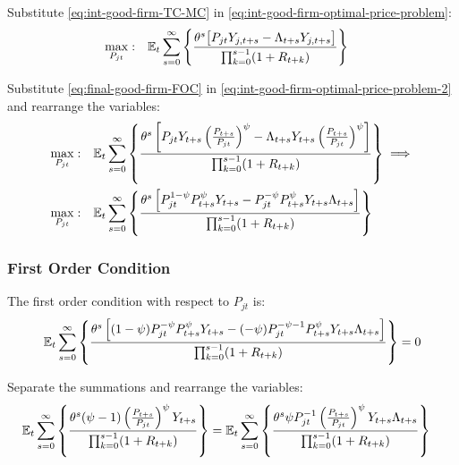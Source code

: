 \documentclass[
thesis.tex
]{subfiles}
\begin{document}
	
	Substitute \ref{eq:int-good-firm-TC-MC} in \ref{eq:int-good-firm-optimal-price-problem}:
	\begin{align}
		\label{eq:int-good-firm-optimal-price-problem-2}
		\max_{P_{jt}}: & \quad {\mathbb{E}_{t}} \sum_{s=0}^{\infty} \left\{ \frac{\theta^s \big[ P_{jt} Y_{j,t+s} - \Lambda_{t+s} Y_{j,t+s} \big]}{\prod_{k=0}^{s-1}(1+R_{t+k})} \right\}
	\end{align}
	
	Substitute \ref{eq:final-good-firm-FOC} in \ref{eq:int-good-firm-optimal-price-problem-2} and rearrange the variables:
	\begin{align}
		\max_{P_{jt}}: & \quad {\mathbb{E}_{t}} \sum_{s=0}^{\infty} \left\{ \frac{\theta^s \left[ P_{jt} Y_{t+s} \left( \frac{P_{t+s}}{P_{jt}} \right)^{\psi} - \Lambda_{t+s} Y_{t+s} \left( \frac{P_{t+s}}{P_{jt}} \right)^{\psi} \right] }{\prod_{k=0}^{s-1}(1+R_{t+k})} \right\} \implies \nonumber 
		\\
		\max_{P_{jt}}: & \quad {\mathbb{E}_{t}} \sum_{s=0}^{\infty} \left\{ \frac{\theta^s \left[ P_{jt}^{1-\psi} P_{t+s}^{\psi} Y_{t+s} - P_{jt}^{-\psi} P_{t+s}^{\psi} Y_{t+s} \Lambda_{t+s} \right] }{\prod_{k=0}^{s-1}(1+R_{t+k})} \right\} \nonumber
	\end{align}
	
	
	\subsubsection*{First Order Condition}
	
	The first order condition with respect to $P_{jt}$ is:
	\begin{align}
		& \quad {\mathbb{E}_{t}} \sum_{s=0}^{\infty} \left\{ \frac{\theta^s \left[ (1-\psi) P_{jt}^{-\psi} P_{t+s}^{\psi} Y_{t+s} - (-\psi) P_{jt}^{-\psi-1} P_{t+s}^{\psi} Y_{t+s} \Lambda_{t+s} \right] }{\prod_{k=0}^{s-1}(1+R_{t+k})} \right\} = 0 \nonumber
	\end{align}
	
	
	Separate the summations and rearrange the variables:
	\begin{align}
		\label{eq:int-good-firm-optimal-price-FOC}
		& {\mathbb{E}_{t}} \sum_{s=0}^{\infty} \left\{ \frac{\theta^s (\psi-1) \left( \frac{P_{t+s}} {P_{jt}} \right)^{\psi} Y_{t+s}} {\prod_{k=0}^{s-1} (1+R_{t+k})} \right\} = {\mathbb{E}_{t}} \sum_{s=0}^{\infty} \left\{ \frac{\theta^s \psi P_{jt}^{-1} \left( \frac{P_{t+s}} {P_{jt}} \right)^{\psi} Y_{t+s} \Lambda_{t+s} }{\prod_{k=0}^{s-1}(1+R_{t+k})} \right\}
	\end{align}
	
\end{document}
